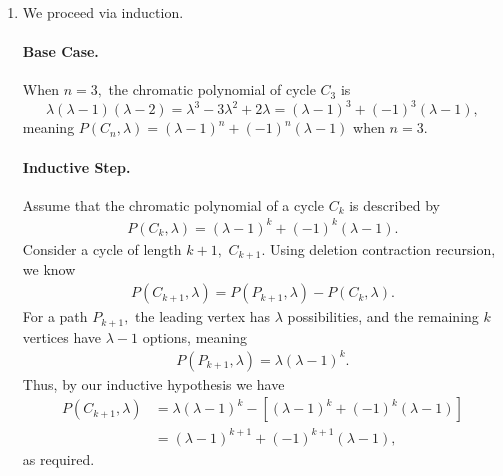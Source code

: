 \documentclass[12pt]{article}
\begin{document}
\begin{enumerate}
\begin{center}
    \end{center}
    which is homeomorphic to $K_5$ and a subgraph of $G.$ By
    Kuratowski's theorem, $G$ cannot be planar.

    \newpage

  \item We proceed via induction.
    \paragraph{Base Case.} When $n = 3,$ the chromatic polynomial of
    cycle $C_3$ is $$\lambda(\lambda - 1)(\lambda - 2) = \lambda^3 -
    3\lambda^2 + 2\lambda = (\lambda - 1)^3 + (-1)^3(\lambda -1),$$
    meaning $P(C_n, \lambda) = (\lambda - 1)^n + (-1)^n (\lambda -
    1)$ when $n = 3.$

    \paragraph{Inductive Step.} Assume that the chromatic polynomial
    of a cycle $C_k$ is described by
    \begin{align*}
      P(C_k, \lambda) = (\lambda-1)^k  +(-1)^k (\lambda - 1).
    \end{align*}
    Consider a cycle of length $k + 1,$ $C_{k+1}.$ Using deletion
    contraction recursion, we know
    \begin{align*}
      P(C_{k+1}, \lambda) = P(P_{k+1}, \lambda) - P(C_{k}, \lambda).
    \end{align*}
    For a path $P_{k+1},$ the leading vertex has $\lambda$
    possibilities, and the remaining $k$ vertices have $\lambda - 1$
    options, meaning
    \begin{align*}
      P(P_{k+1}, \lambda)  = \lambda(\lambda - 1)^k.
    \end{align*}
    Thus, by our inductive hypothesis we have
    \begin{align*}
      P(C_{k+1}, \lambda) &= \lambda(\lambda - 1)^k -  [(\lambda-1)^k
      + (-1)^k(\lambda - 1)] \\
      &= (\lambda - 1)^{k+1} + (-1)^{k+1}(\lambda - 1),
    \end{align*}
    as required.


\end{enumerate}
\end{document}
